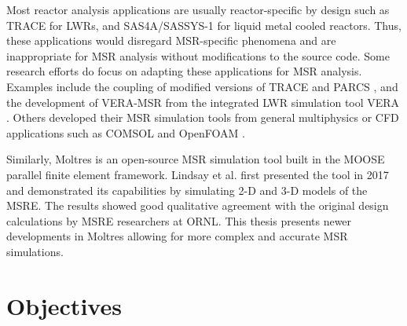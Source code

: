 Most reactor analysis applications are usually reactor-specific by
design such as TRACE \cite{nrc_trace_2007} for \glspl{LWR}, and
SAS4A/SASSYS-1 \cite{fanning_sas4a/sassys-1_2017} for
liquid metal cooled reactors. Thus, these applications would disregard
\gls{MSR}-specific phenomena and are inappropriate for \gls{MSR}
analysis without modifications to the source code. Some research efforts
do focus on adapting these applications for \gls{MSR} analysis. Examples
include the coupling of modified versions of TRACE and PARCS
\cite{pettersen_coupled_2016}, and the development of VERA-MSR from the
integrated \gls{LWR} simulation tool VERA \cite{graham_development_2019}.
Others developed their \gls{MSR} simulation tools from general
multiphysics or \gls{CFD} applications such as COMSOL
\cite{fiorina_modelling_2014} and OpenFOAM \cite{aufiero_development_2014}.

Similarly, Moltres \cite{lindsay_introduction_2018} is an open-source MSR
simulation tool built in the \gls{MOOSE} \cite{gaston_physics-based_2015}
parallel finite element framework. Lindsay et al.
\cite{lindsay_introduction_2018} first presented the tool in 2017 and
demonstrated its capabilities by simulating 2-D and 3-D models of the
\gls{MSRE}. The results showed good qualitative
agreement with the original design calculations by \gls{MSRE} researchers at
\gls{ORNL}. This thesis presents newer developments in Moltres
allowing for more complex and accurate \gls{MSR} simulations.

\section{Objectives}


